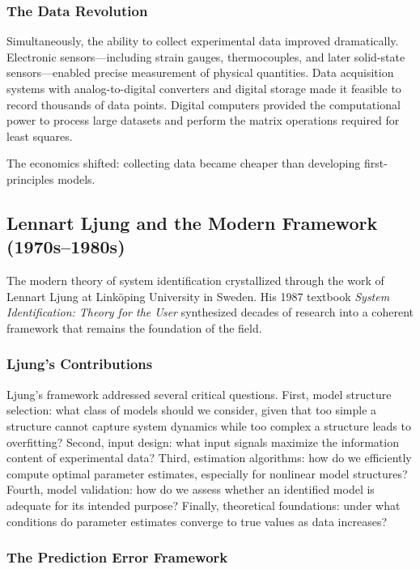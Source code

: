 \subsubsection{The Data Revolution}

Simultaneously, the ability to collect experimental data improved dramatically. Electronic sensors---including strain gauges, thermocouples, and later solid-state sensors---enabled precise measurement of physical quantities. Data acquisition systems with analog-to-digital converters and digital storage made it feasible to record thousands of data points. Digital computers provided the computational power to process large datasets and perform the matrix operations required for least squares.

The economics shifted: collecting data became cheaper than developing first-principles models.

\subsection{Lennart Ljung and the Modern Framework (1970s--1980s)}
\label{subsec:ljung}

The modern theory of system identification crystallized through the work of Lennart Ljung at Link\"{o}ping University in Sweden. His 1987 textbook \textit{System Identification: Theory for the User} synthesized decades of research into a coherent framework that remains the foundation of the field.

\subsubsection{Ljung's Contributions}

Ljung's framework addressed several critical questions. First, model structure selection: what class of models should we consider, given that too simple a structure cannot capture system dynamics while too complex a structure leads to overfitting? Second, input design: what input signals maximize the information content of experimental data? Third, estimation algorithms: how do we efficiently compute optimal parameter estimates, especially for nonlinear model structures? Fourth, model validation: how do we assess whether an identified model is adequate for its intended purpose? Finally, theoretical foundations: under what conditions do parameter estimates converge to true values as data increases?

\subsubsection{The Prediction Error Framework}

